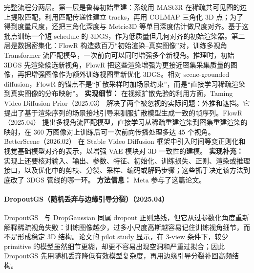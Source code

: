 完整流程分两层。第一层是鲁棒初始重建：系统用 MASt3R 在稀疏共可见图的边上提取匹配，利用匹配传递性建立 tracks，再用 COLMAP 三角化 3D 点；为了得到度量尺度，还把三角化深度与 Metric3D 等单目深度估计做尺度对齐。基于这批点训练一个短 schedule 的 3DGS，作为低质量但几何对齐的初始渲染器。第二层是数据密集化：FlowR 构造数百万“初始渲染--真实图像”对，训练多视角 Transformer 流匹配模型，一次前向可以同时增强多个新视角。推理时，初始 3DGS 先渲染候选新视角，FlowR 把这些渲染增强为更接近密集采集质量的图像，再把增强图像作为额外训练视图重新优化 3DGS。相对 scene-grounded diffusion，FlowR 的锚点不是“扩散采样时加场景约束”，而是“直接学习稀疏渲染到真实图像的分布映射”。
\textbf{实现细节：} 在视频扩散先验的利用方面，Taming Video Diffusion Prior（2025.03） 解决了两个被忽视的实际问题：外推和遮挡。它提出了基于渲染序列的场景接地引导来驯服扩散模型生成一致的帧序列。FlowR（2025.04） 提出多视角流匹配模型，直接学习从稀疏重建渲染到密集重建渲染的映射，在 360 万图像对上训练后可一次前向传播处理多达 45 个视角。BetterScene（2026.02） 在 Stable Video Diffusion 框架中引入时间等变正则化和视觉基础模型对齐的表示，以增强 VAE 模块对 3D 一致性的建模。
\textbf{实现补充：} 实现上还要核对输入、输出、参数、特征、初始化、训练损失、正则、渲染或推理接口，以及优化中的剪枝、分裂、采样、编码或解码步骤；这些抓手决定该方法到底改了 3DGS 管线的哪一环。
\textbf{方法信息：} Meta 参与了这篇论文。



\paragraph{DropoutGS（随机丢弃与边缘引导分裂）（2025.04）}
DropoutGS~\cite{2504_09491} 与 DropGaussian 同属 dropout 正则路线，但它从过参数化角度重新解释稀疏视角失败：训练图像越少，过多小尺度高斯越容易记住训练视角细节，而不是形成稳定 3D 结构。论文的 pilot study 显示，在 3-view 条件下，较少 primitive 的模型虽然细节更糊，却更不容易出现空洞和严重过拟合；因此 DropoutGS 先用随机丢弃降低有效模型复杂度，再用边缘引导分裂补回高频结构。

